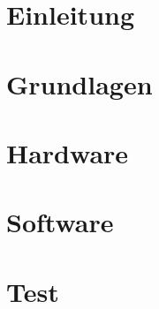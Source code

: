 \documentclass[10pt,a4paper,oneside]{99_fhnwreport}
\begin{document}
\begin{otherlanguage}{ngerman}
\listoftables
\listoffigures
\clearpage

\setcounter{page}{1}

\section{Einleitung}\label{sec:einleitung}

\clearpage

\section{Grundlagen}\label{sec:grundlagen}

\clearpage

\section{Hardware}\label{sec:hardware}

\clearpage


\section{Software}\label{sec:software}

\clearpage

\section{Test}\label{sec:test}

\clearpage


\end{otherlanguage}
\end{document}
